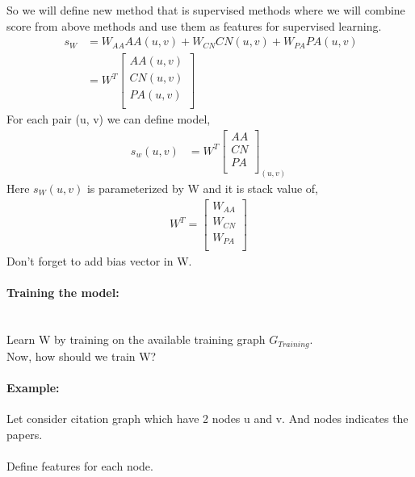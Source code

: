 \documentclass{article}
\begin{document}
So we will define new method that is supervised methods where we will combine score from above methods and use them as features for supervised learning. 
\begin{equation} \
\begin{split}
s_W & = W_{AA} AA(u, v) + W_{CN} CN(u, v) + W_{PA} PA(u, v) \\
 & = W^T \begin{bmatrix}
AA(u, v)\\
CN(u, v)\\
PA(u, v)\\
\end{bmatrix}\
\end{split}
\end{equation}
         For each pair (u, v) we can define model,
         \begin{equation} \label{}
\begin{split}
s_w(u, v)  & = W^T \begin{bmatrix}
AA\\
CN\\
PA\\
\end{bmatrix}_{(u, v)}\
\end{split}
\end{equation}
Here $s_W(u, v)$ is parameterized by W and it is stack value of,
   \begin{equation} \label{}
\begin{split}
 W^T =  \begin{bmatrix}
W_{AA}\\
W_{CN}\\
W_{PA}\\
\end{bmatrix}\
\end{split}
\end{equation} 
Don't forget to add bias vector in W.\\
\paragraph{Training the model:} \\
Learn W by training on the available training graph $G_{Training}$. \\
Now, how should we train W?
\paragraph{Example:}
Let consider citation graph which have 2 nodes u and v. And nodes indicates the papers.\\ \\
Define features for each node. \\ \\
\end{document}
